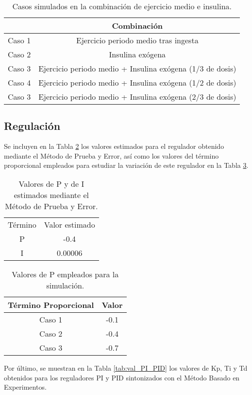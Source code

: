 \begin{table}[htbp]
    \centering
    \caption{Casos simulados en la combinación de ejercicio medio e insulina.}
    \begin{tabular}{|c|c|}
        \hline
         & Combinación \\
        \hline
        Caso 1 & Ejercicio periodo medio tras ingesta \\
        Caso 2 & Insulina exógena\\
        Caso 3 & Ejercicio periodo medio + Insulina exógena (1/3 de dosis) \\
        Caso 4 & Ejercicio periodo medio + Insulina exógena (1/2 de dosis) \\
        Caso 3 & Ejercicio periodo medio + Insulina exógena (2/3 de dosis) \\
        \hline
    \end{tabular}
    \label{tab:comb_medio}
\end{table}

\subsection{Regulación}


Se incluyen en la Tabla \ref{tab:reg_base} los valores estimados para el regulador obtenido mediante el Método de Prueba y Error, así como los valores del término proporcional empleados para estudiar la variación de este regulador en la Tabla \ref{tab:reg_P}.
\clearpage
\begin{table}[htbp]
    \centering
    \caption{Valores de P y de I estimados mediante el Método de Prueba y Error.}
    \begin{tabular}{|c c|}
        \hline
        Término  & Valor estimado \\
        P & -0.4 \\
        I & 0.00006 \\
        \hline
    \end{tabular}
    \label{tab:reg_base}
\end{table}

\begin{table}[htbp]
    \centering
    \caption{Valores de P empleados para la simulación.}
    \begin{tabular}{|c|c|}
        \hline
        Término Proporcional &  Valor \\
        \hline
        Caso 1 & -0.1 \\
        Caso 2 & -0.4 \\
        Caso 3 & -0.7 \\
        \hline
    \end{tabular}
    \label{tab:reg_P}
\end{table}
Por último, se muestran en la Tabla \ref{tab:val_PI_PID} los valores de Kp, Ti y Td obtenidos para los reguladores PI y PID sintonizados con el Método Basado en Experimentos.

